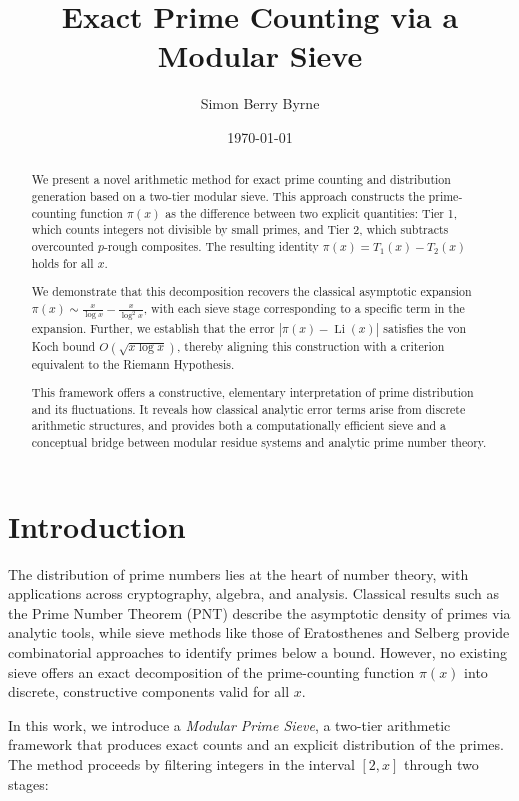 \documentclass[11pt]{article}
\title{Exact Prime Counting via a Modular Sieve}
\author{Simon Berry Byrne}
\date{\today}
\begin{document}
	
	\maketitle
		
		
	\begin{abstract}
		We present a novel arithmetic method for exact prime counting and distribution generation based on a two-tier modular sieve. This approach constructs the prime-counting function $\pi(x)$ as the difference between two explicit quantities: Tier 1, which counts integers not divisible by small primes, and Tier 2, which subtracts overcounted $p$-rough composites. The resulting identity $\pi(x) = T_1(x) - T_2(x)$ holds for all $x$.
		
		We demonstrate that this decomposition recovers the classical asymptotic expansion $\pi(x) \sim \frac{x}{\log x} - \frac{x}{\log^2 x}$, with each sieve stage corresponding to a specific term in the expansion. Further, we establish that the error $|\pi(x) - \operatorname{Li}(x)|$ satisfies the von Koch bound $O(\sqrt{x \log x})$, thereby aligning this construction with a criterion equivalent to the Riemann Hypothesis.
		
		This framework offers a constructive, elementary interpretation of prime distribution and its fluctuations. It reveals how classical analytic error terms arise from discrete arithmetic structures, and provides both a computationally efficient sieve and a conceptual bridge between modular residue systems and analytic prime number theory.
	\end{abstract}

	
	
	
	\section{Introduction}
	
	The distribution of prime numbers lies at the heart of number theory, with applications across cryptography, algebra, and analysis. Classical results such as the Prime Number Theorem (PNT) describe the asymptotic density of primes via analytic tools, while sieve methods like those of Eratosthenes and Selberg provide combinatorial approaches to identify primes below a bound. However, no existing sieve offers an exact decomposition of the prime-counting function $\pi(x)$ into discrete, constructive components valid for all $x$.
	
	In this work, we introduce a \textit{Modular Prime Sieve}, a two-tier arithmetic framework that produces exact counts and an explicit distribution of the primes. The method proceeds by filtering integers in the interval $[2, x]$ through two stages:
	
\end{document}
